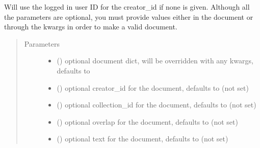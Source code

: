 \documentclass[letterpaper,10pt,english]{sphinxmanual}
\begin{document}
\begin{fulllineitems}
\begin{fulllineitems}
Will use the logged in user ID for the creator\_id if none is given.  Although all the
parameters are optional, you must provide values either in the document or through the
kwargs in order to make a valid document.
\begin{quote}\begin{description}
\item[{Parameters}] \leavevmode\begin{itemize}
\item {} 
 (\sphinxstyleliteralemphasis{\sphinxupquote{, }}) \textendash{} optional document dict, will be overridden with any kwargs, defaults to \sphinxcode{\sphinxupquote{\{\}}}

\item {} 
 (\sphinxstyleliteralemphasis{\sphinxupquote{, }}) \textendash{} optional creator\_id for the document, defaults to  (not set)

\item {} 
 (\sphinxstyleliteralemphasis{\sphinxupquote{, }}) \textendash{} optional collection\_id for the document, defaults to  (not set)

\item {} 
 (\sphinxstyleliteralemphasis{\sphinxupquote{, }}) \textendash{} optional overlap for the document, defaults to  (not set)

\item {} 
 (\sphinxstyleliteralemphasis{\sphinxupquote{, }}) \textendash{} optional text for the document, defaults to  (not set)


\end{itemize}
\end{description}
\end{quote}
\end{fulllineitems}
\end{fulllineitems}
\end{document}
